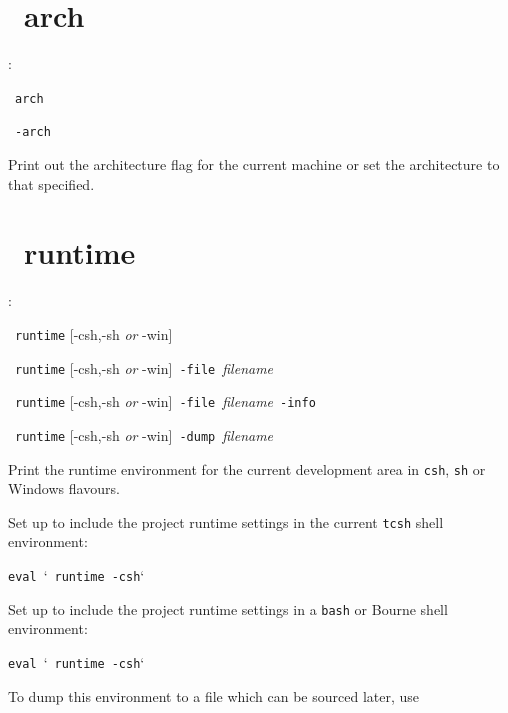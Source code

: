 \section{\scram\ arch}

\cmdintro:

\hspace{5mm}\scram~\texttt{arch}

\hspace{5mm}\scram~\texttt{-arch}~

\ni Print out the architecture flag for the current machine or
set the architecture to that specified.

\section{\scram\ runtime}

\cmdintro:

\hspace{5mm}\scram~\texttt{runtime} [-csh,-sh \textit{or} -win]

\hspace{5mm}\scram~\texttt{runtime} [-csh,-sh \textit{or} -win]~\texttt{-file}~\textit{filename}

\hspace{5mm}\scram~\texttt{runtime} [-csh,-sh \textit{or} -win]~\texttt{-file}~\textit{filename}~\texttt{-info}~

\hspace{5mm}\scram~\texttt{runtime} [-csh,-sh \textit{or} -win]~\texttt{-dump}~\textit{filename}

\ni Print the runtime environment for the current development area
in \texttt{csh}, \texttt{sh} or Windows flavours. 

\mbox{}

\ni Set up to include the project runtime settings
in the current \texttt{tcsh} shell environment:

\hspace{5mm}\texttt{eval}~`\scram~\texttt{runtime}~\texttt{-csh}` 

\ni Set up to include the project runtime settings
in a \texttt{bash} or Bourne shell environment:

\hspace{5mm}\texttt{eval}~`\scram~\texttt{runtime}~\texttt{-csh}` 

\ni To dump this environment to a file which can be sourced later, use

